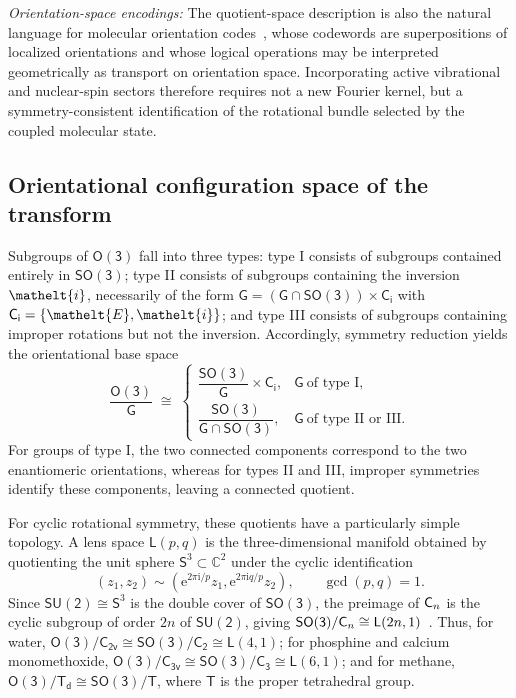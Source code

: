 \documentclass[
  reprint,
  aps,
  prx,
  superscriptaddress,
  amsmath,
  amssymb,
  longbibliography
]{revtex4-2}
\newcommand{\eltfont}[1]{{\let\sigma\eltsigma\mathelt{#1}}}
\newcommand{\grp}[1]{\mathsf{#1}}
\newcommand{\elt}[1]{\eltfont{#1}}
\newcommand{\dirprod}{\times}
\newcommand{\iunit}{\mathrm{i}}
\newcommand{\expe}{\mathrm{e}}
\newcommand{\lensspace}[2]{\mathsf{L}(#1, #2)}
\begin{document}
\emph{Orientation-space encodings:}
The quotient-space description is also the natural language for molecular orientation codes~\cite{PhysRevX.10.031050, albert2025quantumtheorymolecularorientations}, whose codewords are superpositions of localized orientations and whose logical operations may be interpreted geometrically as transport on orientation space. Incorporating active vibrational and nuclear-spin sectors therefore requires not a new Fourier kernel, but a symmetry-consistent identification of the rotational bundle selected by the coupled molecular state.





\subsection{Orientational configuration space of the transform}

Subgroups of $\grp{O(3)}$ fall into three types: type I consists of subgroups contained entirely in $\grp{SO(3)}$; type II consists of subgroups containing the inversion $\elt{i}$, necessarily of the form $\grp{G}=(\grp{G}\cap\grp{SO(3)})\dirprod\grp{C_{i}}$ with $\grp{C_{i}}=\{\elt{E},\elt{i}\}$; and type III consists of subgroups containing improper rotations but not the inversion. Accordingly, symmetry reduction yields the orientational base space
\begin{equation}
  \frac{\grp{O(3)}}{\grp{G}}\;\cong\;
  \begin{cases}
    \dfrac{\grp{SO(3)}}{\grp{G}}\times\grp{C_{i}},
      & \grp{G}\ \text{of type I},\\[10pt]
    \dfrac{\grp{SO(3)}}
    {\grp{G}\cap\grp{SO(3)}},
      & \grp{G}\ \text{of type II or III}.
  \end{cases}
  \label{eq:base-space}
\end{equation}
For groups of type I, the two connected components correspond to the two enantiomeric orientations, whereas for types II and III, improper symmetries identify these components, leaving a connected quotient.

For cyclic rotational symmetry, these quotients have a particularly simple topology. A lens space $\lensspace{p}{q}$ is the three-dimensional manifold obtained by quotienting the unit sphere $\mathsf S^{3}\subset\mathbb C^2$ under the cyclic identification
\begin{equation}
  (z_1,z_2)\sim
  \left(\expe^{2\pi\iunit/p}z_1,\expe^{2\pi\iunit q/p}z_2\right),
  \qquad \gcd(p,q)=1.
\end{equation}
Since $\grp{SU(2)}\cong\mathsf S^{3}$ is the double cover of $\grp{SO(3)}$, the preimage of $\grp{C_{\mathnormal{n}}}$ is the cyclic subgroup of order $2n$ of $\grp{SU(2)}$, giving $\grp{SO(3)}/\grp{C_{\mathnormal{n}}}\cong\lensspace{2n}{1}$~\cite{Postnikov1992}. Thus, for water, $\grp{O(3)}/\grp{C_{2v}}\cong\grp{SO(3)}/\grp{C_{2}} \cong \lensspace{4}{1}$; for phosphine and calcium monomethoxide, $\grp{O(3)}/\grp{C_{3v}}\cong\grp{SO(3)}/\grp{C_{3}} \cong \lensspace{6}{1}$; and for methane, $\grp{O(3)}/\grp{T_{d}}\cong\grp{SO(3)}/\grp{T}$, where $\grp{T}$ is the proper tetrahedral group. 
\end{document}
